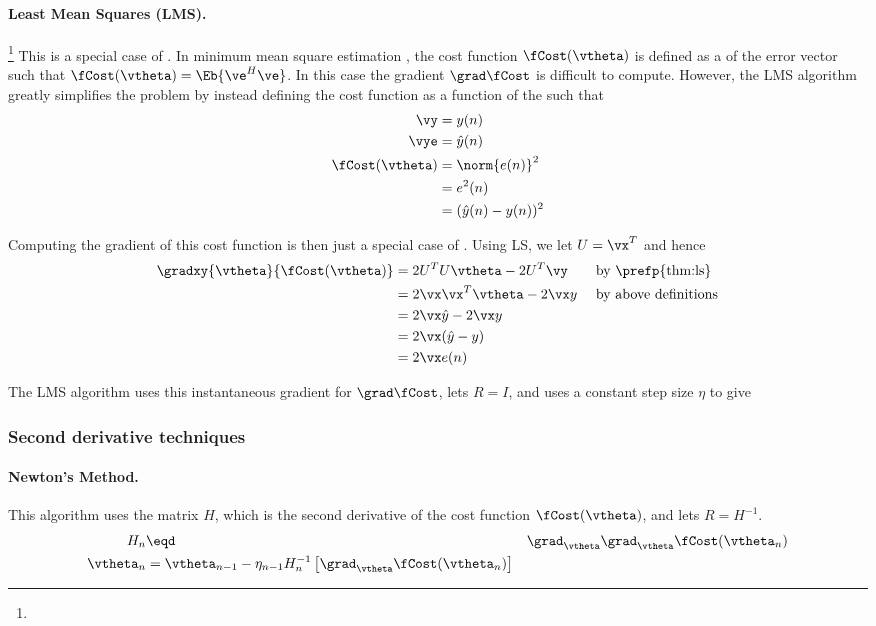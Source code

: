 \paragraph{Least Mean Squares (LMS).}\footnote{}
This is a special case of .
In minimum mean square estimation ,
the cost function $\fCost(\vtheta)$ is defined as a
 of the error vector such that
$\fCost(\vtheta) = \Eb{\ve^H\ve}$.
In this case the gradient $\grad\fCost$ is difficult to compute.
However, the LMS algorithm greatly simplifies the problem by
instead defining the cost function as a function of the
 such that
\begin{align*}
   \vy &= y(n)
\\
   \vye &= \hat{y}(n)
\\
   \fCost(\vtheta)
   &= \norm{e(n)}^2
 \\&= e^2(n)
 \\&= (\hat{y}(n)-y(n))^2
\end{align*}

Computing the gradient of this cost function is then
just a special case of  .
Using LS, we let $U=\vx^T$ and hence
\begin{align*}
   \gradxy{\vtheta}{\fCost(\vtheta)}
   &= 2U^TU \vtheta -2U^T\vy                   && \text{ by \prefp{thm:ls}}
\\ &= 2\vx\vx^T \vtheta -2\vx y               && \text{ by above definitions}
\\ &= 2\vx\hat{y} -2\vx y                    && \text{ }
\\ &= 2\vx(\hat{y} -y)                      && \text{ }
\\ &= 2\vx e(n)                && \text{ }
\end{align*}

The LMS algorithm uses this instantaneous gradient for $\grad\fCost$,
lets $R=I$, and uses a constant step size $\eta$ to give
\subsubsection*{Second derivative techniques}
\paragraph{Newton's Method.}
This algorithm uses the  matrix $H$,
which is the second derivative of the cost function $\fCost(\vtheta)$,
and lets $R=H^{-1}$.
\begin{align*}
   H_n &\eqd& \grad_\vtheta\grad_\vtheta \fCost(\vtheta_n)
\\
   \vtheta_n &= \vtheta_{n-1} - \eta_{n-1} H_n^{-1} \left[\grad_\vtheta\fCost(\vtheta_n)\right]
\end{align*}



